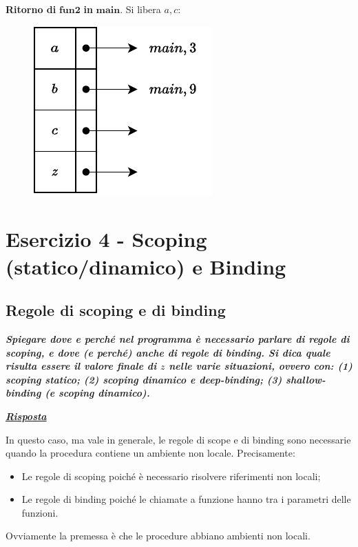 \documentclass[a4paper]{article}
\begin{document}
	\noindent
	\textbf{Ritorno di }$\mathbf{fun2}$\textbf{ in }$\mathbf{main}$. Si libera $a,c$:
	\begin{figure}[!htp]
		\centering
		\includegraphics[width=.4\textwidth]{img/ex3-024.pdf}
	\end{figure}\newpage
	
	\section{Esercizio 4 - Scoping (statico/dinamico) e Binding}
	
	\subsection{Regole di scoping e di binding}
	
	\textcolor{Red3}{\textbf{\emph{Spiegare dove e perché nel programma è necessario parlare di regole di scoping, e dove (e perché) anche di regole di binding. Si dica quale risulta essere il valore finale di $z$ nelle varie situazioni, ovvero con: (1) scoping statico; (2) scoping dinamico e deep-binding; (3) shallow-binding (e scoping dinamico).}}}
	
	
	\noindent
	\textcolor{Green4}{\textbf{\emph{\underline{Risposta}}}}\newline
	
	\noindent
	In questo caso, ma vale in generale, le regole di scope e di binding sono necessarie quando la procedura contiene un ambiente non locale. Precisamente:
	\begin{itemize}
		\item Le regole di scoping poiché è necessario risolvere riferimenti non locali;
		
		\item Le regole di binding poiché le chiamate a funzione hanno tra i parametri delle funzioni.
	\end{itemize}
	Ovviamente la premessa è che le procedure abbiano ambienti non locali.\newline
	
\end{document}

